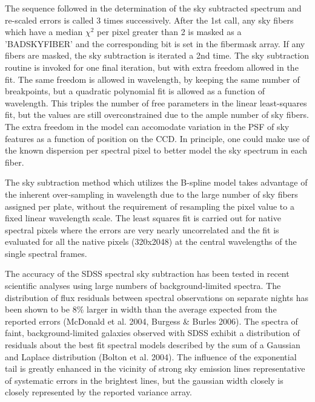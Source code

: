\documentclass[12pt,preprint]{aastex}
\begin{document}

The sequence followed in the determination of the sky subtracted spectrum
and re-scaled errors is called 3 times successively.  After the 1st call,
any sky fibers which have a median $\chi^2$ per pixel greater than 2 is 
masked as a 'BADSKYFIBER' and the corresponding bit is set in the fibermask
array.  If any fibers are masked, the sky subtraction is iterated a 2nd time.
The sky subtraction routine is invoked for one final iteration, but with extra 
freedom allowed in the fit.  The same freedom is allowed in wavelength, by
keeping the same number of breakpoints, but a quadratic polynomial fit is
allowed as a function of wavelength.  This triples the number of free 
parameters in the linear least-squares fit, but the values are still 
overconstrained due to the ample number of sky fibers.  The extra freedom
in the model can accomodate variation in the PSF of sky features as a function 
of position on the CCD.  In principle, one could make use of the known 
dispersion per spectral pixel to better model the sky spectrum
in each fiber.

The sky subtraction method which utilizes the B-spline model takes advantage 
of the inherent over-sampling in wavelength due to the large number of 
sky fibers assigned per plate, without the requirement of resampling the 
pixel value to a fixed linear wavelength scale.  The least squares fit
is carried out for native spectral pixels where the errors are very nearly 
uncorrelated and the fit is evaluated for all the native pixels (320x2048)  
at the central wavelengths of the single spectral frames.
    
The accuracy of the SDSS spectral sky subtraction has been tested in recent
scientific analyses using large numbers of background-limited spectra.   
The distribution of flux residuals between spectral observations 
on separate nights has been shown to be 8\% larger in width than the average expected
from the reported errors (McDonald et al. 2004, Burgess \& Burles 2006).
The spectra of faint, background-limited galaxies observed with SDSS exhibit a 
distribution of residuals about the best fit spectral models described by the 
sum of a
Gaussian and Laplace distribution (Bolton et al. 2004).  
The influence of the exponential tail is greatly enhanced in the vicinity of strong sky 
emission lines representative of systematic errors in the brightest lines, but the gaussian 
width closely is closely represented by the reported variance array.
\end{document}
